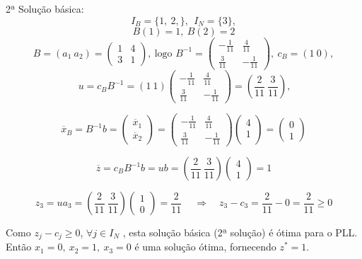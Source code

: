 \documentclass[12pt]{exam}
\begin{document}
\begin{questions}
\begin{solution}
2ª Solução básica:
	$$I_B = \{1,~2,\},~~I_N = \{3\},$$
	$$B(1) = 1,~ B(2) = 2$$
	$$B = (a_1~a_2) =\begin{pmatrix}
	1 & 4 \\
	3 & 1
	\end{pmatrix},~\text{logo } B^{-1} = \begin{pmatrix}
	-\frac{1}{11} & \frac{4}{11} \\
	\frac{3}{11} & -\frac{1}{11}
	\end{pmatrix},~c_B = (1~0),$$
	$$~u = c_BB^{-1} = (1~1)\begin{pmatrix}
	-\frac{1}{11} & \frac{4}{11} \\
	\frac{3}{11} & -\frac{1}{11}	
	\end{pmatrix} = (\frac{2}{11}~\frac{3}{11}),$$
	
	$$ \overline{x}_B =B^{-1}b = \begin{pmatrix}
	\overline{x}_1 \\ 
	\overline{x}_2 
	\end{pmatrix} = \begin{pmatrix}
	-\frac{1}{11} & \frac{4}{11} \\
	\frac{3}{11} & -\frac{1}{11}
	\end{pmatrix} \begin{pmatrix}
	4 \\ 
	1 \\ 
	\end{pmatrix} = \begin{pmatrix}
	0 \\ 
	1
	\end{pmatrix}$$

	$$\overline{z} = c_BB^{-1}b = ub = (\frac{2}{11}~\frac{3}{11}) \begin{pmatrix}
	4 \\ 
	1 
	\end{pmatrix} = 1$$
	
	$$z_3 = ua_3 = (\frac{2}{11}~\frac{3}{11})\begin{pmatrix}
	1 \\ 
	0 
	\end{pmatrix} = \frac{2}{11}~\quad \Rightarrow \quad z_3 - c_3 = \frac{2}{11} - 0 = \frac{2}{11} \geq 0$$
	
	Como $z_j - c_j \geq 0$, $\forall j \in I_N$ , esta solução básica (2ª solução) é ótima para o PLL. \\ 
Então $x_1 = 0 ,~x_2 = 1,~x_3 = 0$ é uma solução ótima, fornecendo $z^{*} = 1$. 	\end{solution}	

\end{questions}
	
\end{document}
